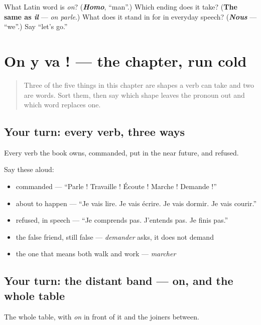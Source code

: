 \begin{tcolorbox}[breakable,colback=teal!4,colframe=teal!35!black,title={Before you move on}]
What Latin word is \emph{on}? (\emph{\textbf{Homo}}, \textquotedblleft{}man\textquotedblright{}.) Which ending does it take? (\textbf{The same as \emph{il}} — \emph{on parle}.) What does it stand in for in everyday speech? (\emph{\textbf{Nous}} — \textquotedblleft{}we\textquotedblright{}.) Say \textquotedblleft{}let's go.\textquotedblright{}
\end{tcolorbox}
\section[Practice]{On y va ! — the chapter, run cold}

\label{lesson:FR-R37-on-y-va}



\begin{quote}
Three of the five things in this chapter are shapes a verb can take and two are words. Sort them, then say which shape leaves the pronoun out and which word replaces one.
\end{quote}

\subsection*{Your turn: every verb, three ways}
Every verb the book owns, commanded, put in the near future, and refused.

Say these aloud:

\begin{itemize}
\raggedright
  \item commanded — \textquotedblleft{}Parle ! Travaille ! Écoute ! Marche ! Demande !\textquotedblright{}
  \item about to happen — \textquotedblleft{}Je vais lire. Je vais écrire. Je vais dormir. Je vais courir.\textquotedblright{}
  \item refused, in speech — \textquotedblleft{}Je comprends pas. J'entends pas. Je finis pas.\textquotedblright{}
  \item the false friend, still false — \emph{demander} asks, it does not demand
  \item the one that means both walk and work — \emph{marcher}
\end{itemize}

\subsection*{Your turn: the distant band — on, and the whole table}
The whole table, with \emph{on} in front of it and the joiners between.

